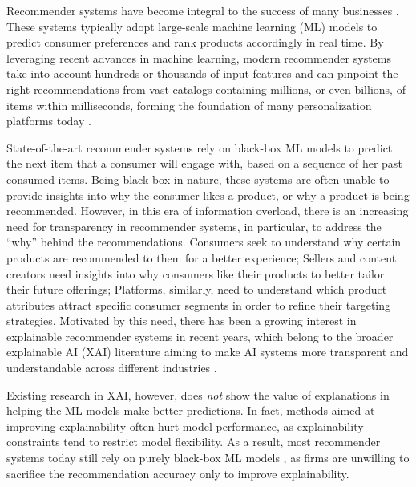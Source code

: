 

Recommender systems have become integral to the success of many businesses \citep{ricci2010introduction, schafer1999recommender}. These systems typically adopt large-scale machine learning (ML) models to predict consumer preferences and rank products accordingly in real time. By leveraging recent advances in machine learning, modern recommender systems take into account hundreds or thousands of input features and can pinpoint the right recommendations from vast catalogs containing millions, or even billions, of items within milliseconds, forming the foundation of many personalization platforms today \citep{gomez2015netflix, solsman2018youtube, wang2024recommending}. 

State-of-the-art recommender systems rely on black-box ML models to predict the next item that a consumer will engage with, based on a sequence of her past consumed items. Being black-box in nature, these systems are often unable to provide insights into why the consumer likes a product, or why a product is being recommended. However, in this era of information overload, there is an increasing need for transparency in recommender systems, in particular, to address the ``why'' behind the recommendations. Consumers seek to understand why certain products are recommended to them for a better experience; Sellers and content creators need insights into why consumers like their products to better tailor their future offerings; Platforms, similarly, need to understand which product attributes attract specific consumer segments in order to refine their targeting strategies. Motivated by this need, there has been a growing interest in explainable recommender systems \citep{zhang2020explainable} in recent years, which belong to the broader explainable AI (XAI) literature aiming to make AI systems more transparent and understandable across different industries \citep{pathak2020chemically, sun2024sparse, tang2020knowing, zhang2020inprem}. 

Existing research in XAI, however, does \emph{not} show the value of explanations in helping the ML models make better predictions. In fact, methods aimed at improving explainability often hurt model performance, as explainability constraints tend to restrict model flexibility. As a result, most recommender systems today still rely on purely black-box ML models \citep{covington2016deep, zhai2024actions}, as firms are unwilling to sacrifice the recommendation accuracy only to improve explainability. 

